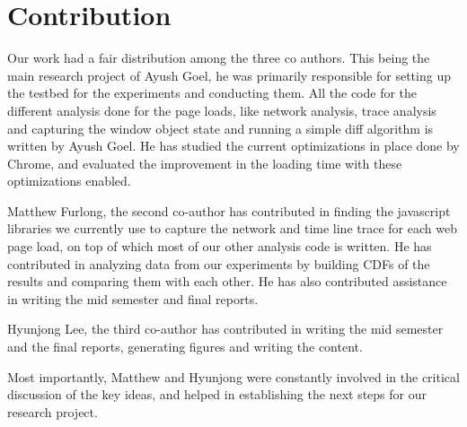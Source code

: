 \section{Contribution}
\label{sec:contribution}

Our work had a fair distribution among the three co authors. 
This being the main research project of Ayush Goel, he was primarily 
responsible for setting up the testbed for the experiments and conducting them. 
All the code for the different analysis done for the page loads, like network
analysis, trace analysis and capturing the window object state and running
a simple diff algorithm is written by Ayush Goel. He has studied the current 
optimizations in place done by Chrome, and evaluated the improvement in the
loading time with these optimizations enabled. 

Matthew Furlong, the second co-author has contributed in finding 
the javascript libraries we currently use to capture the network
and time line trace for each web page load, on top of which most of 
our other analysis code is written. He has contributed in analyzing
data from our experiments by building CDFs of the results and 
comparing them with each other. He has also contributed assistance in writing
the mid semester and final reports.

Hyunjong Lee, the third co-author has contributed in writing the mid semester
and the final reports, generating figures and writing the content. 

Most importantly, Matthew and Hyunjong were constantly involved in the
critical discussion of the key ideas, and helped in establishing the next
steps for our research project. 